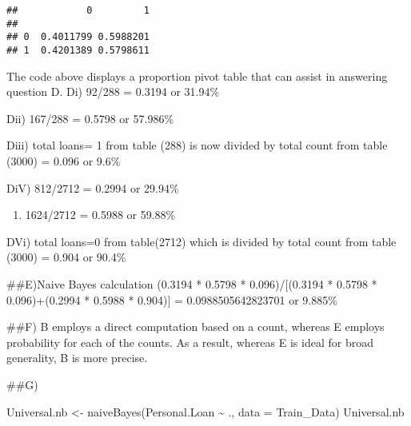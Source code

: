 \documentclass[
]{article}
\newenvironment{Shaded}{\begin{snugshade}}{\end{snugshade}}
\newcommand{\AttributeTok}[1]{\textcolor[rgb]{0.77,0.63,0.00}{#1}}
\newcommand{\DecValTok}[1]{\textcolor[rgb]{0.00,0.00,0.81}{#1}}
\newcommand{\FunctionTok}[1]{\textcolor[rgb]{0.00,0.00,0.00}{#1}}
\newcommand{\NormalTok}[1]{#1}
\newcommand{\OtherTok}[1]{\textcolor[rgb]{0.56,0.35,0.01}{#1}}
\newcommand{\SpecialCharTok}[1]{\textcolor[rgb]{0.00,0.00,0.00}{#1}}
\providecommand{\tightlist}{%
  \setlength{\itemsep}{0pt}\setlength{\parskip}{0pt}}
\begin{document}
\begin{Shaded}
\end{Shaded}

\begin{verbatim}
##            0         1
##                       
## 0  0.4011799 0.5988201
## 1  0.4201389 0.5798611
\end{verbatim}

The code above displays a proportion pivot table that can assist in
answering question D. Di) 92/288 = 0.3194 or 31.94\%

Dii) 167/288 = 0.5798 or 57.986\%

Diii) total loans= 1 from table (288) is now divided by total count from
table (3000) = 0.096 or 9.6\%

DiV) 812/2712 = 0.2994 or 29.94\%

\begin{enumerate}
\def\labelenumi{\Roman{enumi})}
\setcounter{enumi}{504}
\tightlist
\item
  1624/2712 = 0.5988 or 59.88\%
\end{enumerate}

DVi) total loans=0 from table(2712) which is divided by total count from
table (3000) = 0.904 or 90.4\%

\#\#E)Naive Bayes calculation (0.3194 * 0.5798 * 0.096)/{[}(0.3194 *
0.5798 * 0.096)+(0.2994 * 0.5988 * 0.904){]} = 0.0988505642823701 or
9.885\%

\#\#F) B employs a direct computation based on a count, whereas E
employs probability for each of the counts. As a result, whereas E is
ideal for broad generality, B is more precise.

\#\#G)

\begin{Shaded}
\begin{Highlighting}[]
\NormalTok{Universal.nb }\OtherTok{\textless{}{-}} \FunctionTok{naiveBayes}\NormalTok{(Personal.Loan }\SpecialCharTok{\textasciitilde{}}\NormalTok{ ., }\AttributeTok{data =}\NormalTok{ Train\_Data)}
\NormalTok{Universal.nb}
\end{Highlighting}
\end{Shaded}
\end{document}
